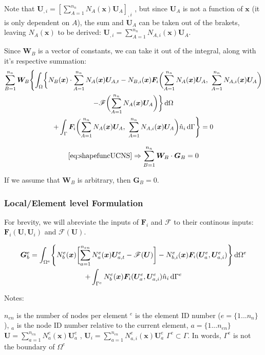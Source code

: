 \documentclass[12pt, letterpaper, twoside]{article}
\renewcommand{\vec}[1]{\bm{#1}}
\newcommand{\U}{\vec{U}}
\newcommand{\G}{\vec{G}}
\newcommand{\F}{\vec{F}}
\newcommand{\W}{\vec{W}}
\newcommand{\x}{\vec{x}}
\newcommand{\NAx}{N_A(\x)}
\newcommand{\NBx}{N_B(\x)}
\newcommand{\NAix}{N_{A,i}(\x)}
\newcommand{\NBix}{N_{B,i}(\x)}
\newcommand{\Neax}{N^e_a(\x)}
\newcommand{\Nebx}{N^e_b(\x)}
\newcommand{\Neaix}{N^e_{a,i}(\x)}
\newcommand{\Nebix}{N^e_{b,i}(\x)}
\newcommand{\sumA}[1]{\sum_{A=1}^{#1}}
\newcommand{\sumB}[1]{\sum_{B=1}^{#1}}
\newcommand{\suma}[1]{\sum_{a=1}^{#1}}
\newcommand{\src}{\vec{\mathscr{F}}}
\begin{document}
            Note that \(\U_{,i} = [\sumA{n_n} \NAx \U_A]_{,i}\) , but since \(\U_A\) is not a function of \(\x\) (it is only dependent on \(A\)), the sum and \(\U_A\) can be taken out of the brakets, leaving \(\NAx\) to be derived: \(\U_{,i} = \sumA{n_n} \NAix \U_A\).

            Since \(\W_B\) is a vector of constants, we can take it out of the integral, along with it's respective summation:
            \begin{multline} \label{eq:shapefuncUCNS}
                \sumB{n_n} \W_B  \Biggl\{\int_\Omega \biggl\{  \NBx  \cdot \sumA{n_n} \NAx \U_{A,t} 
                -  \NBix  \F_i \biggl(\sumA{n_n} \NAx \U_A,\ \sumA{n_n} \NAix \U_A\biggr) \\
                -   \src\biggl(\sumA{n_n} \NAx \U_A \biggr) \biggr\} \dif \Omega \\
                + \int_\Gamma \F_i\biggl(\sumA{n_n} \NAx \U_A,\ \sumA{n_n} \NAix \U_A\biggr) \hat n_i \dif \Gamma \Biggr\} = 0
            \end{multline}

            \begin{equation}
                \cref{eq:shapefuncUCNS} \Rightarrow \sumB{n_n} \W_B \cdot \G_B = 0
            \end{equation}

            If we assume that \(\W_B\) is arbitrary, then \(\G_B=0\).

        \subsubsection{Local/Element level Formulation}
            For brevity, we will abreviate the inputs of \(\F_i\) and \(\src\) to their continous inputs: \(\F_i(\U, \U_i)\) and \(\src(\U)\).

            \begin{multline} 
                \G_b^e = \int_{\Omega^e} \Biggl\{ \Nebx \biggl[ \suma{n_{en}} \Neax \U_{a,t}^e - \src(\U) \biggr] - \Nebix \F_i(\U_a^e, \U_{a,i}^e) \Biggr\} \dif \Omega^e \\
                + \int_{\Gamma^e} \Nebx \F_i(\U_a^e, \U_{a,i}^e) \hat n_i \dif \Gamma^e
            \end{multline}

            Notes:
            \begin{outline}[enumerate]
                \1 \(n_{en}\) is the number of nodes per element
                \1 \(^e\) is the element ID number (\(e = \{1 ... n_n\}\)), 
                \1 \(_a\) is the node ID number relative to the current element, \(a = \{1 ... n_{en}\}\)
                \1 \(\U = \suma{n_{en}} \Neax \U_a^e\) , \(\U_i = \suma{n_{en}} \Neaix \U_a^e\)
                \1 \(\Gamma^e \subset \Gamma \). In words, \(\Gamma^e\) is not the boundary of \(\Omega^e\)
                
            \end{outline}
\end{document}
